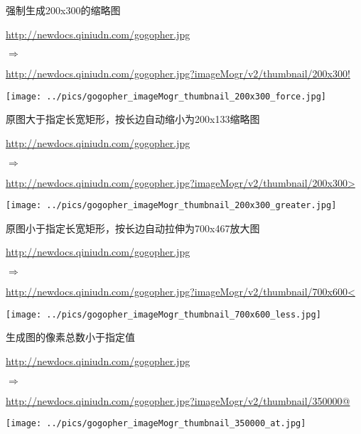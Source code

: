 \documentclass[11pt, oneside]{book}
\newcommand{\qsym}[1]{
\footnotesize
\noindent
#1\par
\normalsize
}
\newcommand{\qsamplelink}[1]{
\vspace{0.2em}
\noindent
#1\par
\vspace{0.1em}
}
\newcommand{\qurl}[1]{\footnotesize\url{#1}\normalsize}
\begin{document}
\begin{sample}
  \caption{强制生成200x300的缩略图}
    \qsamplelink{\qurl{http://newdocs.qiniudn.com/gogopher.jpg}}
    \qsym{$\Rightarrow$}
    \qsamplelink{\qurl{http://newdocs.qiniudn.com/gogopher.jpg?imageMogr/v2/thumbnail/200x300!}}

    \begin{center}
      \texttt{[image: ../pics/gogopher\_imageMogr\_thumbnail\_200x300\_force.jpg]}
    \end{center}
  \label{imageMogr-thumbnail-200x300-force}
\end{sample}

\begin{sample}
  \caption{原图大于指定长宽矩形，按长边自动缩小为200x133缩略图}
    \qsamplelink{\qurl{http://newdocs.qiniudn.com/gogopher.jpg}}
    \qsym{$\Rightarrow$}
    \qsamplelink{\qurl{http://newdocs.qiniudn.com/gogopher.jpg?imageMogr/v2/thumbnail/200x300>}}

    \begin{center}
      \texttt{[image: ../pics/gogopher\_imageMogr\_thumbnail\_200x300\_greater.jpg]}
    \end{center}
  \label{imageMogr-thumbnail-200x300-greater}
\end{sample}

\begin{sample}
  \caption{原图小于指定长宽矩形，按长边自动拉伸为700x467放大图}
    \qsamplelink{\qurl{http://newdocs.qiniudn.com/gogopher.jpg}}
    \qsym{$\Rightarrow$}
    \qsamplelink{\qurl{http://newdocs.qiniudn.com/gogopher.jpg?imageMogr/v2/thumbnail/700x600<}}

    \begin{center}
      \texttt{[image: ../pics/gogopher\_imageMogr\_thumbnail\_700x600\_less.jpg]}
    \end{center}
  \label{imageMogr-thumbnail-700x600-less}
\end{sample}

\begin{sample}
  \caption{生成图的像素总数小于指定值}
    \qsamplelink{\qurl{http://newdocs.qiniudn.com/gogopher.jpg}}
    \qsym{$\Rightarrow$}
    \qsamplelink{\qurl{http://newdocs.qiniudn.com/gogopher.jpg?imageMogr/v2/thumbnail/350000@}}

    \begin{center}
      \texttt{[image: ../pics/gogopher\_imageMogr\_thumbnail\_350000\_at.jpg]}
    \end{center}
  \label{imageMogr-thumbnail-350000-at}
\end{sample}
\end{document}
